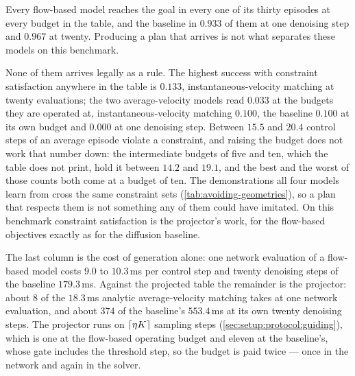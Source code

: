 Every flow-based model reaches the goal in every one of its thirty
episodes at every budget in the table, and the baseline in $0.933$ of them at one denoising step and
$0.967$ at twenty. Producing a plan that arrives is not what separates these models on this benchmark.

None of them arrives legally as a rule. The highest success with constraint satisfaction
anywhere in the table is $0.133$, instantaneous-velocity matching at twenty evaluations; the two
average-velocity models read $0.033$ at the budgets they are operated at, instantaneous-velocity
matching $0.100$, the baseline $0.100$ at its own budget and $0.000$ at one denoising step. Between
$15.5$ and $20.4$ control steps of an average episode violate a constraint, and raising the budget does
not work that number down: the intermediate budgets of five and ten, which the table does not print,
hold it between $14.2$ and $19.1$, and the best and the worst of those counts both come at a budget of ten.
The demonstrations all four models learn from cross the
same constraint sets (\autoref{tab:avoiding-geometries}), so a plan that respects them is not something
any of them could have imitated. On this benchmark constraint satisfaction is the projector's work, for
the flow-based objectives exactly as for the diffusion baseline.

The last column is the cost of generation alone: one network evaluation of a flow-based model costs $9.0$ to
$10.3$\,ms per control step and twenty denoising steps of the baseline $179.3$\,ms. Against the projected
table the remainder is the projector: about $8$ of the $18.3$\,ms analytic average-velocity matching
takes at one network evaluation, and about $374$ of the baseline's $553.4$\,ms at its own twenty
denoising steps. The projector runs on
$\lceil \eta K \rceil$ sampling steps (\autoref{sec:setup:protocol:guiding}), which is one at the
flow-based operating budget and eleven at the baseline's, whose gate includes the threshold step, so the
budget is paid twice --- once in the network and again in the solver.

